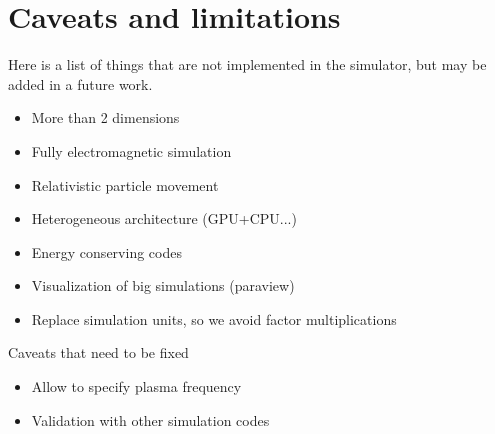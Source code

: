 \chapter{Caveats and limitations}

Here is a list of things that are not implemented in the simulator, but may be 
added in a future work.

\begin{itemize}
\item More than 2 dimensions
\item Fully electromagnetic simulation
\item Relativistic particle movement
\item Heterogeneous architecture (GPU+CPU...)
\item Energy conserving codes
\item Visualization of big simulations (paraview)
\item Replace simulation units, so we avoid factor multiplications
\end{itemize}
%
Caveats that need to be fixed
%
\begin{itemize}
\item Allow to specify plasma frequency
\item Validation with other simulation codes
\end{itemize}

